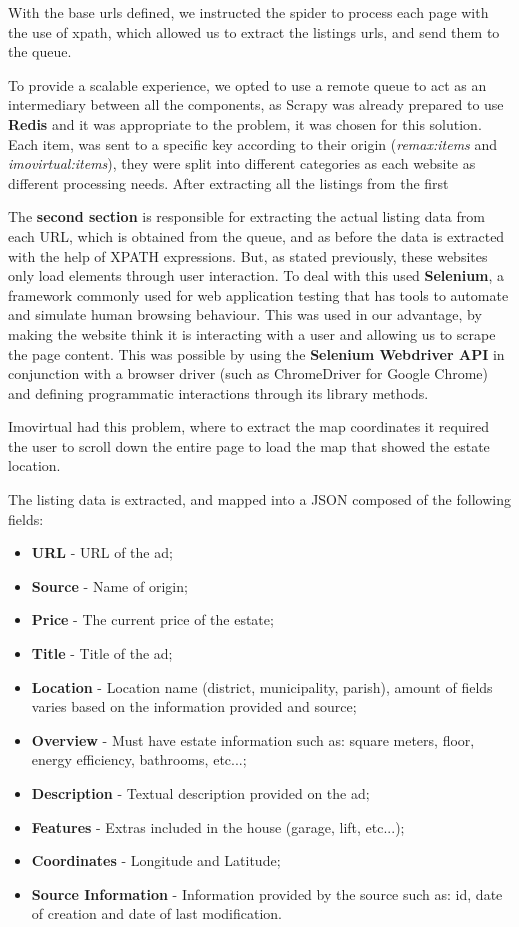 With the base \acrshort{url}s defined, we instructed the spider to process each page with the use of \acrshort{xpath}, which allowed us to extract the listings \acrshort{url}s, and send them to the queue. 

To provide a scalable experience, we opted to use a remote queue to act as an intermediary between all the components, as Scrapy was already prepared to use \textbf{Redis} and it was appropriate to the problem, it was chosen for this solution. Each item, was sent to a specific key according to their origin (\textit{remax:items} and \textit{imovirtual:items}), they were split into different categories as each website as different processing needs. After extracting all the listings from the first

The \textbf{second section} is responsible for extracting the actual listing data from each URL, which is obtained from the queue, and as before the data is extracted with the help of XPATH expressions. But, as stated previously, these websites only load elements through user interaction. To deal with this used \textbf{Selenium}, a framework commonly used for web application testing that has tools to automate and simulate human browsing behaviour. This was used in our advantage, by making the website think it is interacting with a user and allowing us to scrape the page content. This was possible by using the \textbf{Selenium Webdriver API} in conjunction with a browser driver (such as ChromeDriver for Google Chrome) and defining programmatic interactions through its library methods.

Imovirtual had this problem, where to extract the map coordinates it required the user to scroll down the entire page to load the map that showed the estate location.

The listing data is extracted, and mapped into a JSON composed of the following fields:

\begin{itemize}
    \item \textbf{URL} - URL of the ad;
    \item \textbf{Source} - Name of origin;
    \item \textbf{Price} - The current price of the estate;
    \item \textbf{Title} - Title of the ad;
    \item \textbf{Location} - Location name (district, municipality, parish), amount of fields varies based on the information provided and source;
    \item \textbf{Overview} - Must have estate information such as: square meters, floor, energy efficiency, bathrooms, etc...;
    \item \textbf{Description} - Textual description provided on the ad;
    \item \textbf{Features} - Extras included in the house (garage, lift, etc...);
    \item \textbf{Coordinates} - Longitude and Latitude;
    \item \textbf{Source Information} - Information provided by the source such as: id, date of creation and date of last modification.
\end{itemize}

